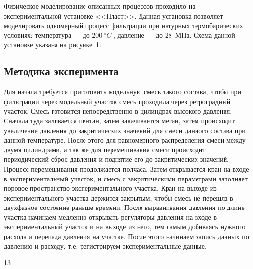 \documentclass[a4paper,14pt]{article}
\theoremstyle{plain} %
\theoremstyle{definition} %
\theoremstyle{remark} %
\begin{document}
Физическое моделирование описанных процессов проходило на экспериментальной установке <<Пласт>>. Данная установка позволяет моделировать одномерный процесс фильтрации при натурных термобарических условиях: температура --- до $200~^{\circ}C$ , давление --- до $28$~МПа. Схема данной установке указана на рисунке~1.

\subsection{Методика эксперимента}
 
Для начала требуется приготовить модельную смесь такого состава, чтобы при фильтрации через модельный участок смесь проходила через ретроградный участок. Смесь готовится непосредственно в цилиндрах высокого давления. Сначала туда заливается пентан, затем закачивается метан, затем происходит увеличение давления до закритических значений для смеси данного состава при данной температуре. После этого для равномерного распределения смеси между двумя цилиндрами, а так же для перемешивания смеси происходит периодический сброс давления и поднятие его до закритических значений. Процесс перемешивания продолжается полчаса. Затем открывается кран на входе в экспериментальный участок, и смесь с закритическими параметрами заполняет поровое пространство экспериментального участка. Кран на выходе из экспериментального участка держится закрытым, чтобы смесь не перешла в двухфазное состояние раньше времени. После выравнивания давления по длине участка начинаем медленно открывать регуляторы давления на входе в экспериментальный участок и на выходе из него, тем самым добиваясь нужного расхода и перепада давления на участке. После этого начинаем запись данных по давлению и расходу, т.е. регистрируем экспериментальные данные. 

\newpage

13
\end{document}
